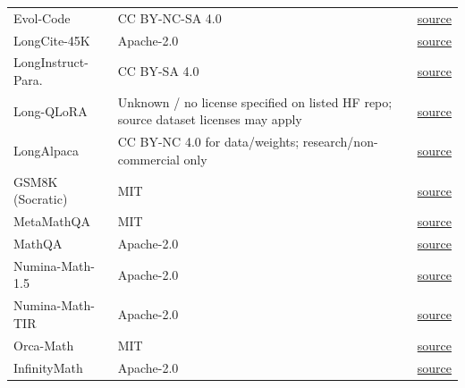 \begin{longtable}{@{}>{\raggedright\arraybackslash}p{}>{\raggedright\arraybackslash}p{}>{\raggedright\arraybackslash}p{}@{}}
Evol-Code & CC BY-NC-SA 4.0 & \href{https://huggingface.co/datasets/nickrosh/Evol-Instruct-Code-80k-v1}{source} \\
LongCite-45K & Apache-2.0 & \href{https://huggingface.co/datasets/THUDM/LongCite-45k}{source} \\
LongInstruct-Para. & CC BY-SA 4.0 & \href{https://huggingface.co/datasets/yuyijiong/Long-Instruction-with-Paraphrasing}{source} \\
Long-QLoRA & Unknown / no license specified on listed HF repo; source dataset licenses may apply & \href{https://huggingface.co/datasets/YeungNLP/LongQLoRA-Dataset}{source} \\
LongAlpaca & CC BY-NC 4.0 for data/weights; research/non-commercial only & \href{https://huggingface.co/datasets/Yukang/LongAlpaca-12k}{source} \\
GSM8K (Socratic) & MIT & \href{https://huggingface.co/datasets/openai/gsm8k}{source} \\
MetaMathQA & MIT & \href{https://huggingface.co/datasets/meta-math/MetaMathQA}{source} \\
MathQA & Apache-2.0 & \href{https://math-qa.github.io/math-QA/data/MathQA.zip}{source} \\
Numina-Math-1.5 & Apache-2.0 & \href{https://huggingface.co/datasets/AI-MO/NuminaMath-1.5}{source} \\
Numina-Math-TIR & Apache-2.0 & \href{https://huggingface.co/datasets/AI-MO/NuminaMath-TIR}{source} \\
Orca-Math & MIT & \href{https://huggingface.co/datasets/microsoft/orca-math-word-problems-200k}{source} \\
InfinityMath & Apache-2.0 & \href{https://huggingface.co/datasets/BAAI/InfinityMATH}{source} \\
\end{longtable}
\endgroup
